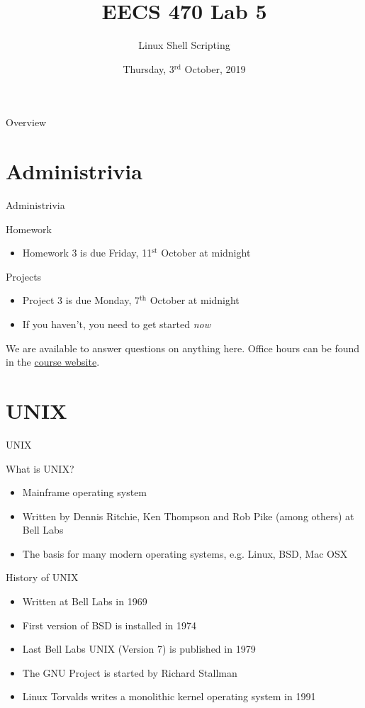 \documentclass[table,dvipsnames]{beamer}
\title[Lab 5: Scripting]{EECS 470 Lab 5}
\subtitle{Linux Shell Scripting}
\institute[University of Michigan]{Department of Electrical Engineering and 
			Computer Science \\
			College of Engineering \\
			University of Michigan}
\date{Thursday, 3$^{\text{rd}}$ October, 2019}
\begin{document}
\frame{\titlepage}

\begin{frame}{Overview}
	\tableofcontents
\end{frame}

\section{Administrivia}
\begin{frame}{Administrivia}
	\begin{block}{Homework}
		\begin{itemize}
			\item Homework 3 is due Friday, 11$^{\text{st}}$ October at midnight
		\end{itemize}
	\end{block}
	\begin{block}{Projects}
		\begin{itemize}
			\item Project 3 is due Monday, 7$^{\text{th}}$ October at midnight
			\item If you haven't, you need to get started \emph{now}
		\end{itemize}
	\end{block}
	\begin{block}{}
		We are available to answer questions on anything here. Office hours can
		be found in the
		\href{https://www.eecs.umich.edu/courses/eecs470/?page=home.php}{course
		website}.
	\end{block}
\end{frame}

\section{UNIX}
\begin{frame}{UNIX}
	\begin{block}{What is UNIX?}
		\begin{itemize}
			\item Mainframe operating system
			\item Written by Dennis Ritchie, Ken Thompson and Rob Pike (among
				others) at Bell Labs
			\item The basis for many modern operating systems, e.g. Linux, BSD,
				Mac OSX
		\end{itemize}
	\end{block}
	\begin{block}{History of UNIX}
		\begin{itemize}
			\item Written at Bell Labs in 1969
			\item First version of BSD is installed in 1974
			\item Last Bell Labs UNIX (Version 7) is published in 1979
			\item The GNU Project is started by Richard Stallman
			\item Linux Torvalds writes a monolithic kernel operating system in
				1991
		\end{itemize}
	\end{block}
\end{frame}
\end{document}
